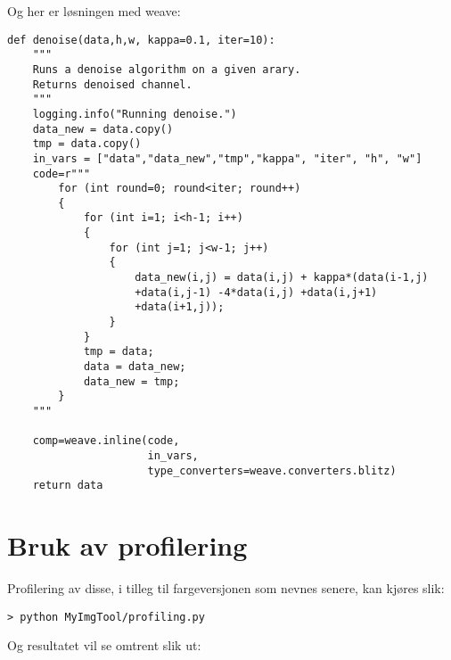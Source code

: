 \documentclass{article}
\renewenvironment{shadedwbar}{
\def\FrameCommand{\color[rgb]{0.7,     0.95686, 1}\vrule width 1mm\normalcolor\colorbox{shadecolor}}\FrameRule0.6pt
\MakeFramed {\advance\hsize-2mm\FrameRestore}\vskip3mm}{\vskip0mm\endMakeFramed}
\renewenvironment{shadedquoteBlueBar}[1][]{
\bgroup\rmfamily
\fboxsep=0mm\relax
\begin{shadedwbar}
\list{}{\parsep=-2mm\parskip=0mm\topsep=0pt\leftmargin=2mm
\rightmargin=2\leftmargin\leftmargin=4pt\relax}
\item\relax}
{\endlist\end{shadedwbar}\egroup}
\begin{document}
Og her er løsningen med weave:

\begin{shadedquoteBlueBar}
\fontsize{9pt}{9pt}
\begin{Verbatim}
def denoise(data,h,w, kappa=0.1, iter=10):
    """
    Runs a denoise algorithm on a given arary.
    Returns denoised channel.
    """
    logging.info("Running denoise.")
    data_new = data.copy()
    tmp = data.copy()
    in_vars = ["data","data_new","tmp","kappa", "iter", "h", "w"]
    code=r"""
        for (int round=0; round<iter; round++)
        {
            for (int i=1; i<h-1; i++)
            {
                for (int j=1; j<w-1; j++)
                {
                    data_new(i,j) = data(i,j) + kappa*(data(i-1,j)
                    +data(i,j-1) -4*data(i,j) +data(i,j+1)
                    +data(i+1,j));
                }
            }
            tmp = data;
            data = data_new;
            data_new = tmp;
        }
    """

    comp=weave.inline(code,
                      in_vars,
                      type_converters=weave.converters.blitz)
    return data
\end{Verbatim}
\end{shadedquoteBlueBar}
\noindent


\section{Bruk av profilering}
Profilering av disse, i tilleg til fargeversjonen som nevnes senere, kan kjøres slik:
\begin{Verbatim}[numbers=none,frame=lines,label=\fbox{{\tiny Terminal}},fontsize=\fontsize{9pt}{9pt},
labelposition=topline,framesep=2.5mm,framerule=0.7pt]
> python MyImgTool/profiling.py
\end{Verbatim}
\noindent

Og resultatet vil se omtrent slik ut:
\end{document}
